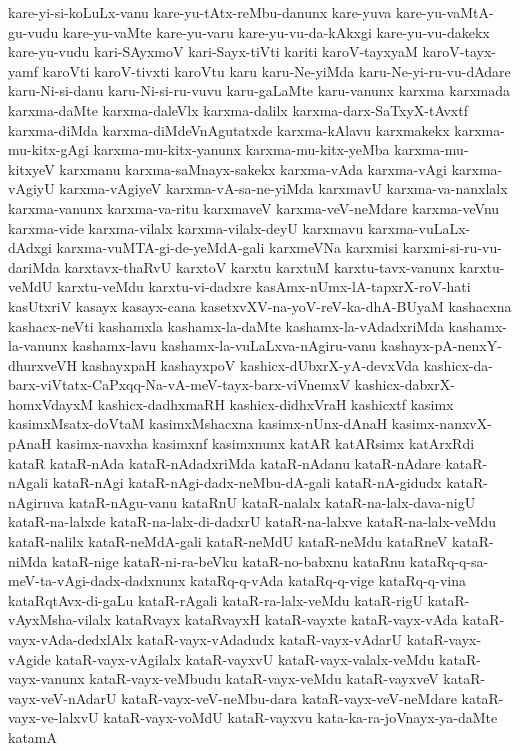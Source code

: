 {kare-yi-si-koLuLx-vanu
kare-yu-tAtx-reMbu-danunx
kare-yuva
kare-yu-vaMtA-gu-vudu
kare-yu-vaMte
kare-yu-varu
kare-yu-vu-da-kAkxgi
kare-yu-vu-dakekx
kare-yu-vudu
kari-SAyxmoV
kari-Sayx-tiVti
kariti
karoV-tayxyaM
karoV-tayx-yamf
karoVti
karoV-tivxti
karoVtu
karu
karu-Ne-yiMda
karu-Ne-yi-ru-vu-dAdare
karu-Ni-si-danu
karu-Ni-si-ru-vuvu
karu-gaLaMte
karu-vanunx
karxma
karxmada
karxma-daMte
karxma-daleVlx
karxma-dalilx
karxma-darx-SaTxyX-tAvxtf
karxma-diMda
karxma-diMdeVnAgutatxde
karxma-kAlavu
karxmakekx
karxma-mu-kitx-gAgi
karxma-mu-kitx-yanunx
karxma-mu-kitx-yeMba
karxma-mu-kitxyeV
karxmanu
karxma-saMnayx-sakekx
karxma-vAda
karxma-vAgi
karxma-vAgiyU
karxma-vAgiyeV
karxma-vA-sa-ne-yiMda
karxmavU
karxma-va-nanxlalx
karxma-vanunx
karxma-va-ritu
karxmaveV
karxma-veV-neMdare
karxma-veVnu
karxma-vide
karxma-vilalx
karxma-vilalx-deyU
karxmavu
karxma-vuLaLx-dAdxgi
karxma-vuMTA-gi-de-yeMdA-gali
karxmeVNa
karxmisi
karxmi-si-ru-vu-dariMda
karxtavx-thaRvU
karxtoV
karxtu
karxtuM
karxtu-tavx-vanunx
karxtu-veMdU
karxtu-veMdu
karxtu-vi-dadxre
kasAmx-nUmx-lA-tapxrX-roV-hati
kasUtxriV
kasayx
kasayx-cana
kasetxvXV-na-yoV-reV-ka-dhA-BUyaM
kashacxna
kashacx-neVti
kashamxla
kashamx-la-daMte
kashamx-la-vAdadxriMda
kashamx-la-vanunx
kashamx-lavu
kashamx-la-vuLaLxva-nAgiru-vanu
kashayx-pA-nenxY-dhurxveVH
kashayxpaH
kashayxpoV
kashicx-dUbxrX-yA-devxVda
kashicx-da-barx-viVtatx-CaPxqq-Na-vA-meV-tayx-barx-viVnemxV
kashicx-dabxrX-homxVdayxM
kashicx-dadhxmaRH
kashicx-didhxVraH
kashicxtf
kasimx
kasimxMsatx-doVtaM
kasimxMshacxna
kasimx-nUnx-dAnaH
kasimx-nanxvX-pAnaH
kasimx-navxha
kasimxnf
kasimxnunx
katAR
katARsimx
katArxRdi
kataR
kataR-nAda
kataR-nAdadxriMda
kataR-nAdanu
kataR-nAdare
kataR-nAgali
kataR-nAgi
kataR-nAgi-dadx-neMbu-dA-gali
kataR-nA-gidudx
kataR-nAgiruva
kataR-nAgu-vanu
kataRnU
kataR-nalalx
kataR-na-lalx-dava-nigU
kataR-na-lalxde
kataR-na-lalx-di-dadxrU
kataR-na-lalxve
kataR-na-lalx-veMdu
kataR-nalilx
kataR-neMdA-gali
kataR-neMdU
kataR-neMdu
kataRneV
kataR-niMda
kataR-nige
kataR-ni-ra-beVku
kataR-no-babxnu
kataRnu
kataRq-q-sa-meV-ta-vAgi-dadx-dadxnunx
kataRq-q-vAda
kataRq-q-vige
kataRq-q-vina
kataRqtAvx-di-gaLu
kataR-rAgali
kataR-ra-lalx-veMdu
kataR-rigU
kataR-vAyxMsha-vilalx
kataRvayx
kataRvayxH
kataR-vayxte
kataR-vayx-vAda
kataR-vayx-vAda-dedxlAlx
kataR-vayx-vAdadudx
kataR-vayx-vAdarU
kataR-vayx-vAgide
kataR-vayx-vAgilalx
kataR-vayxvU
kataR-vayx-valalx-veMdu
kataR-vayx-vanunx
kataR-vayx-veMbudu
kataR-vayx-veMdu
kataR-vayxveV
kataR-vayx-veV-nAdarU
kataR-vayx-veV-neMbu-dara
kataR-vayx-veV-neMdare
kataR-vayx-ve-lalxvU
kataR-vayx-voMdU
kataR-vayxvu
kata-ka-ra-joVnayx-ya-daMte
katamA
}
